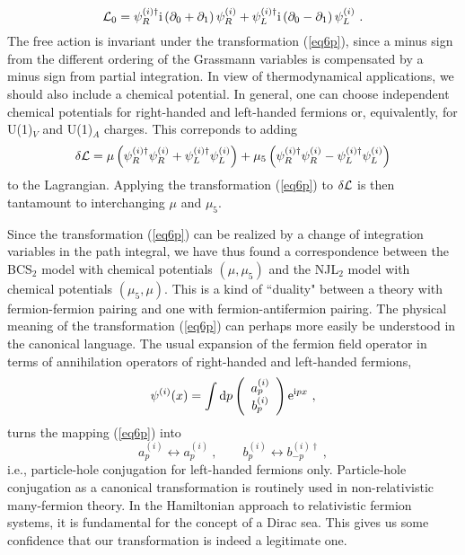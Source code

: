 \documentclass[a4paper,twocolumn,aps]{revtex4}
\begin{document}
\begin{equation}
{\cal L}_0 = \psi_R^{(i)\dagger} {\rm i}\left( \partial_0 + \partial_1\right) \psi_R^{(i)} +
 \psi_L^{(i)\dagger} {\rm i}\left( \partial_0 - \partial_1\right) \psi_L^{(i)} \ . 
\label{eq7p}
\end{equation}
The free action is invariant under the transformation (\ref{eq6p}), since a minus sign
from the different ordering of the Grassmann variables is compensated by a minus
sign from partial integration. In view of thermodynamical applications, we should also
include a chemical potential. In general, one can choose independent chemical
potentials for right-handed and left-handed fermions or, equivalently, for U(1)$_V$ and
U(1)$_A$ charges. This correponds to adding
\begin{equation}
\delta {\cal L} = \mu \left( \psi_R^{(i)\dagger} \psi_R^{(i)} +\psi_L^{(i)\dagger} \psi_L^{(i)}\right)
+ \mu_5  \left( \psi_R^{(i)\dagger} \psi_R^{(i)} - \psi_L^{(i)\dagger} \psi_L^{(i)}\right)
\label{eq8p}
\end{equation}
to the Lagrangian. Applying the transformation (\ref{eq6p}) to $\delta {\cal L}$
is then tantamount to interchanging $\mu$ and $\mu_5$. 

Since the transformation (\ref{eq6p}) can be realized by a change of integration
variables in the path integral, we have thus found a correspondence between the BCS$_2$ model
with chemical potentials $(\mu, \mu_5)$ and the NJL$_2$ model with chemical potentials $(\mu_5,\mu)$.
This is a kind of ``duality" between a theory with fermion-fermion pairing and one with
fermion-antifermion pairing. The physical meaning of the transformation (\ref{eq6p}) can perhaps
more easily be understood in the canonical language. The usual expansion of the fermion field operator
in terms of annihilation operators of right-handed and left-handed fermions,
\begin{equation}
\psi^{(i)}(x) = \int {\rm d}p \left( \begin{array}{c} a^{(i)}_p \\ b^{(i)}_p \end{array} \right) {\rm e}^{{\rm i}px}\ , 
\label{eq9p}
\end{equation}
turns the mapping (\ref{eq6p}) into
\begin{equation}
a^{(i)}_p \leftrightarrow a^{(i)}_p \ , \qquad b^{(i)}_p \leftrightarrow b^{(i)\dagger}_{-p} \ ,
\label{eq10p}
\end{equation}
i.e., particle-hole conjugation for left-handed fermions only. Particle-hole conjugation as a canonical
transformation is routinely used in non-relativistic many-fermion theory. In the Hamiltonian approach to 
relativistic fermion systems, it is fundamental for the concept of a Dirac sea.  
This gives us some confidence that our transformation is indeed a legitimate one. 
\end{document}
